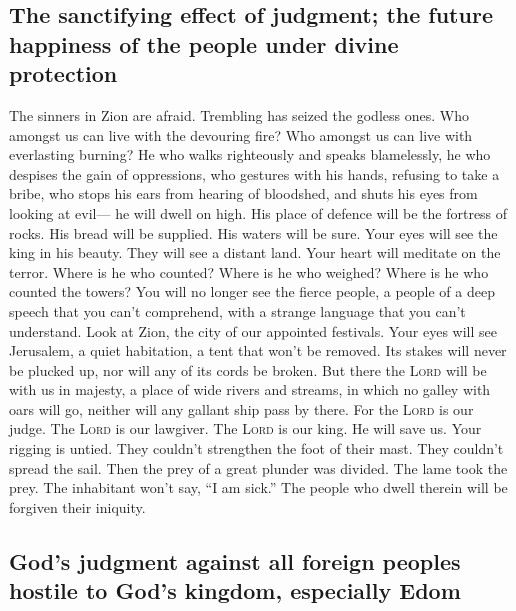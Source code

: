 \hypertarget{the-sanctifying-effect-of-judgment-the-future-happiness-of-the-people-under-divine-protection}{%
\subsection{The sanctifying effect of judgment; the future happiness of
the people under divine
protection}\label{the-sanctifying-effect-of-judgment-the-future-happiness-of-the-people-under-divine-protection}}

 The sinners in Zion are afraid. Trembling has seized the
godless ones. Who amongst us can live with the devouring fire? Who
amongst us can live with everlasting burning?  He who
walks righteously and speaks blamelessly, he who despises the gain of
oppressions, who gestures with his hands, refusing to take a bribe, who
stops his ears from hearing of bloodshed, and shuts his eyes from
looking at evil---  he will dwell on high. His place of
defence will be the fortress of rocks. His bread will be supplied. His
waters will be sure.  Your eyes will see the king in his
beauty. They will see a distant land.  Your heart will
meditate on the terror. Where is he who counted? Where is he who
weighed? Where is he who counted the towers?  You will no
longer see the fierce people, a people of a deep speech that you can't
comprehend, with a strange language that you can't understand.
 Look at Zion, the city of our appointed festivals. Your
eyes will see Jerusalem, a quiet habitation, a tent that won't be
removed. Its stakes will never be plucked up, nor will any of its cords
be broken.  But there the \textsc{Lord} will be with us
in majesty, a place of wide rivers and streams, in which no galley with
oars will go, neither will any gallant ship pass by there.
 For the \textsc{Lord} is our judge. The \textsc{Lord} is
our lawgiver. The \textsc{Lord} is our king. He will save us.
 Your rigging is untied. They couldn't strengthen the
foot of their mast. They couldn't spread the sail. Then the prey of a
great plunder was divided. The lame took the prey.  The
inhabitant won't say, ``I am sick.'' The people who dwell therein will
be forgiven their iniquity.

\hypertarget{gods-judgment-against-all-foreign-peoples-hostile-to-gods-kingdom-especially-edom}{%
\subsection{God's judgment against all foreign peoples hostile to God's
kingdom, especially
Edom}\label{gods-judgment-against-all-foreign-peoples-hostile-to-gods-kingdom-especially-edom}}

